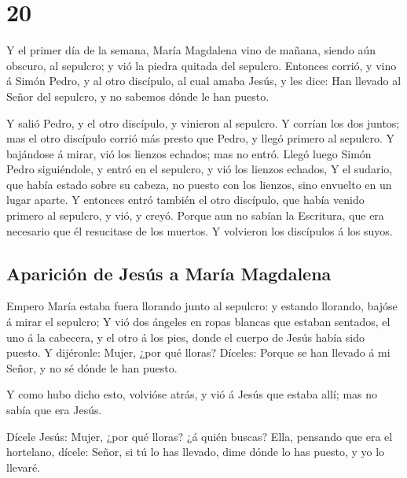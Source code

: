 \hypertarget{section-19}{%
\section{20}\label{section-19}}

 Y el primer día de la semana, María Magdalena vino de
mañana, siendo aún obscuro, al sepulcro; y vió la piedra quitada del
sepulcro.  Entonces corrió, y vino á Simón Pedro, y al otro
discípulo, al cual amaba Jesús, y les dice: Han llevado al Señor del
sepulcro, y no sabemos dónde le han puesto.

 Y salió Pedro, y el otro discípulo, y vinieron al sepulcro.
 Y corrían los dos juntos; mas el otro discípulo corrió más
presto que Pedro, y llegó primero al sepulcro.  Y bajándose
á mirar, vió los lienzos echados; mas no entró.  Llegó luego
Simón Pedro siguiéndole, y entró en el sepulcro, y vió los lienzos
echados,  Y el sudario, que había estado sobre su cabeza, no
puesto con los lienzos, sino envuelto en un lugar aparte.  Y
entonces entró también el otro discípulo, que había venido primero al
sepulcro, y vió, y creyó.  Porque aun no sabían la
Escritura, que era necesario que él resucitase de los muertos.
 Y volvieron los discípulos á los suyos.

\hypertarget{apariciuxf3n-de-jesuxfas-a-maruxeda-magdalena}{%
\subsection{Aparición de Jesús a María
Magdalena}\label{apariciuxf3n-de-jesuxfas-a-maruxeda-magdalena}}

 Empero María estaba fuera llorando junto al sepulcro: y
estando llorando, bajóse á mirar el sepulcro;  Y vió dos
ángeles en ropas blancas que estaban sentados, el uno á la cabecera, y
el otro á los pies, donde el cuerpo de Jesús había sido puesto.
 Y dijéronle: Mujer, ¿por qué lloras? Díceles: Porque se
han llevado á mi Señor, y no sé dónde le han puesto.

 Y como hubo dicho esto, volvióse atrás, y vió á Jesús que
estaba allí; mas no sabía que era Jesús.

 Dícele Jesús: Mujer, ¿por qué lloras? ¿á quién buscas?
Ella, pensando que era el hortelano, dícele: Señor, si tú lo has
llevado, dime dónde lo has puesto, y yo lo llevaré.

